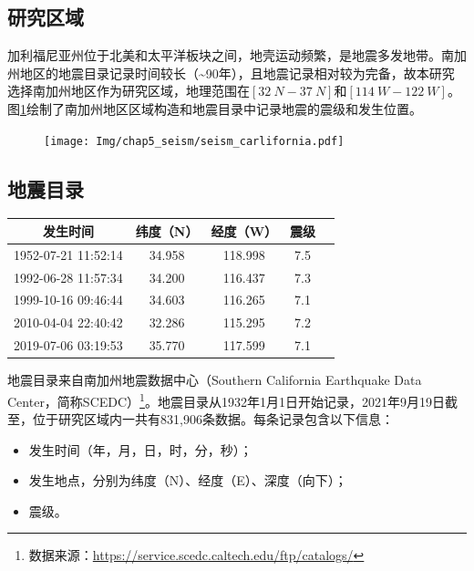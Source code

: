 \subsection{研究区域}\label{sec:seism_area}

加利福尼亚州位于北美和太平洋板块之间，地壳运动频繁，是地震多发地带。南加州地区的地震目录记录时间较长（\sim 90年），且地震记录相对较为完备，故本研究选择南加州地区作为研究区域，地理范围在$[\SI{32}{N}-\SI{37}{N}]$和$[\SI{114}{W}-\SI{122}{W}]$。图\ref{fig:seism_california}绘制了南加州地区区域构造和地震目录中记录地震的震级和发生位置。

\begin{figure}[!htbp]
  \centering
  \texttt{[image: Img/chap5\_seism/seism\_carlifornia.pdf]}
  \label{fig:seism_california}
\end{figure}

\subsection{地震目录}\label{sec:seism_catolog}

\begin{table}[!htbp]
  \label{tab:seism_magnitude_7}
  \centering
  \footnotesize
  \begin{tabular}{ccccc} 
    \toprule
    发生时间 & 纬度（N） & 经度（W） & 震级 \\
    \midrule
    1952-07-21 11:52:14 & 34.958 & 118.998 & 7.5 \\
    1992-06-28 11:57:34 & 34.200 & 116.437 & 7.3 \\
    1999-10-16 09:46:44 & 34.603 & 116.265 & 7.1 \\
    2010-04-04 22:40:42 & 32.286 & 115.295 & 7.2 \\
    2019-07-06 03:19:53 & 35.770 & 117.599 & 7.1 \\
    \bottomrule
  \end{tabular}
\end{table}


地震目录来自南加州地震数据中心（Southern California Earthquake Data Center，简称SCEDC）\footnote{数据来源：\href{https://service.scedc.caltech.edu/ftp/catalogs/}{https://service.scedc.caltech.edu/ftp/catalogs/}}。地震目录从1932年1月1日开始记录，2021年9月19日截至，位于研究区域内一共有831,906条数据。每条记录包含以下信息：
\begin{itemize}
  \item[(1)] 发生时间（年，月，日，时，分，秒）；
  \item[(2)] 发生地点，分别为纬度（N）、经度（E）、深度（向下）；
  \item[(3)] 震级。
\end{itemize}

